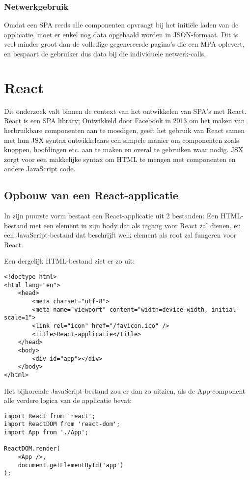 \subsubsection{Netwerkgebruik}

Omdat een SPA reeds alle componenten opvraagt bij het initiële laden van de applicatie, moet er enkel nog data opgehaald worden in JSON-formaat. Dit is veel minder groot dan de volledige gegenereerde pagina's die een MPA oplevert, en bespaart de gebruiker dus data bij die individuele netwerk-calls.

\section{React}

Dit onderzoek valt binnen de context van het ontwikkelen van SPA's met React. React is een SPA library; Ontwikkeld door Facebook in 2013 om het maken van herbruikbare componenten aan te moedigen, geeft het gebruik van React samen met hun JSX syntax ontwikkelaars een simpele manier om componenten zoals knoppen, hoofdingen etc. aan te maken en overal te gebruiken waar nodig. JSX zorgt voor een makkelijke syntax om HTML te mengen met componenten en andere JavaScript code.

\subsection{Opbouw van een React-applicatie}

In zijn puurste vorm bestaat een React-applicatie uit 2 bestanden: Een HTML-bestand met een element in zijn body dat als ingang voor React zal dienen, en een JavaScript-bestand dat beschrijft welk element als root zal fungeren voor React.

Een dergelijk HTML-bestand ziet er zo uit:

\begin{lstlisting}
<!doctype html>
<html lang="en">
    <head>
        <meta charset="utf-8">
        <meta name="viewport" content="width=device-width, initial-scale=1">
        <link rel="icon" href="/favicon.ico" />
        <title>React-applicatie</title>
    </head>
    <body>
        <div id="app"></div>
    </body>
</html>
\end{lstlisting}

Het bijhorende JavaScript-bestand zou er dan zo uitzien, als de App-component alle verdere logica van de applicatie bevat:

\begin{lstlisting}
import React from 'react';
import ReactDOM from 'react-dom';
import App from './App';

ReactDOM.render(
    <App />,
    document.getElementById('app')
);
\end{lstlisting}

